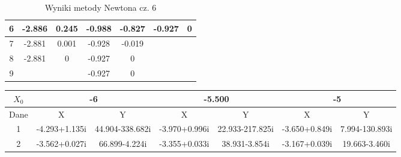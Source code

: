 \documentclass[a4paper, 11pt]{article}
\begin{document}
\begin{enumerate}
\begin{itemize}
\begin{table}[p]
\begin{tabular}{|c|c|c|c|c|c|c|}
\hline                                                         
6  & -2.886 & 0.245 & -0.988 & -0.827 & -0.927 &  0\\  
\hline                                                         
7  & -2.881 & 0.001 & -0.928 & -0.019 &  &  \\    
\hline                                                         
8  & -2.881 & 0 & -0.927 & 0 &  &  \\    
\hline                                                         
9  &  &  & -0.927 & 0 &  &  \\     
\hline                                                         
\end{tabular}                                                  
\caption{Wyniki metody Newtona cz. 6}                          
\label{table:Wyniki metody Newtona cz. 6}                      
\end{table}                                                    
\begin{table}[p]                                                                                                
\centering                                                                                                   
\hspace*{-2cm}\begin{tabular}{|c|c|c|c|c|c|c|}                                                                             
\hline                                                                                                       
\( X_0 \)  & \multicolumn{2}{c|}{-6 } &\multicolumn{2}{c|}{-5.500 }& \multicolumn{2}{c|}{-5  }\\                                                 
\hline                                                                                                       
Dane & X & Y & X & Y & X & Y \\                                                                             
\hline                                                                                                       
1  & -4.293+1.135i & 44.904-338.682i & -3.970+0.996i & 22.933-217.825i & -3.650+0.849i & 7.994-130.893i \\
\hline                                                                                                       
2  & -3.562+0.027i & 66.899-4.224i & -3.355+0.033i & 38.931-3.854i & -3.167+0.039i & 19.663-3.460i \\     
\hline                                                                                                       

\end{tabular}
\end{table}
\end{itemize}
\end{enumerate}
\end{document}
